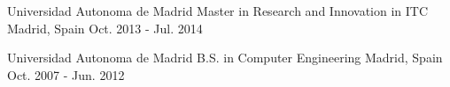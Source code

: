 

\begin{cventries}

  \cventry
    {Universidad Autonoma de Madrid} %
    {Master in Research and Innovation in ITC} %
    {Madrid, Spain} %
    {Oct. 2013 - Jul. 2014} %
    {
    }

  \cventry
    {Universidad Autonoma de Madrid}
    {B.S. in Computer Engineering}
    {Madrid, Spain} %
    {Oct. 2007 - Jun. 2012} %
    {
    }

\end{cventries}
